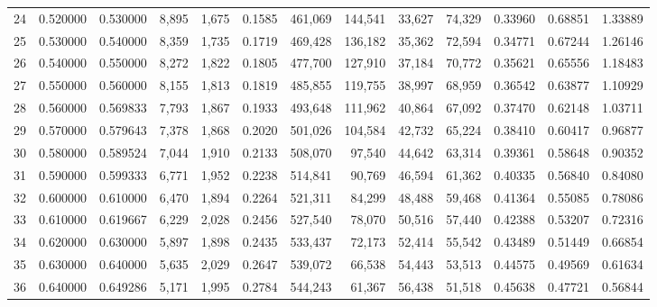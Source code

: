 \begin{tabular}{rrrrrrrrrrrrr}
24 &  0.520000 &  0.530000 &   8,895 &  1,675 &                                     0.1585 &  461,069 &  144,541 &   33,627 &   74,329 &  0.33960 &  0.68851 &  1.33889 \\
25 &  0.530000 &  0.540000 &   8,359 &  1,735 &                                     0.1719 &  469,428 &  136,182 &   35,362 &   72,594 &  0.34771 &  0.67244 &  1.26146 \\
26 &  0.540000 &  0.550000 &   8,272 &  1,822 &                                     0.1805 &  477,700 &  127,910 &   37,184 &   70,772 &  0.35621 &  0.65556 &  1.18483 \\
27 &  0.550000 &  0.560000 &   8,155 &  1,813 &                                     0.1819 &  485,855 &  119,755 &   38,997 &   68,959 &  0.36542 &  0.63877 &  1.10929 \\
28 &  0.560000 &  0.569833 &   7,793 &  1,867 &                                     0.1933 &  493,648 &  111,962 &   40,864 &   67,092 &  0.37470 &  0.62148 &  1.03711 \\
29 &  0.570000 &  0.579643 &   7,378 &  1,868 &                                     0.2020 &  501,026 &  104,584 &   42,732 &   65,224 &  0.38410 &  0.60417 &  0.96877 \\
30 &  0.580000 &  0.589524 &   7,044 &  1,910 &                                     0.2133 &  508,070 &   97,540 &   44,642 &   63,314 &  0.39361 &  0.58648 &  0.90352 \\
31 &  0.590000 &  0.599333 &   6,771 &  1,952 &                                     0.2238 &  514,841 &   90,769 &   46,594 &   61,362 &  0.40335 &  0.56840 &  0.84080 \\
32 &  0.600000 &  0.610000 &   6,470 &  1,894 &                                     0.2264 &  521,311 &   84,299 &   48,488 &   59,468 &  0.41364 &  0.55085 &  0.78086 \\
33 &  0.610000 &  0.619667 &   6,229 &  2,028 &                                     0.2456 &  527,540 &   78,070 &   50,516 &   57,440 &  0.42388 &  0.53207 &  0.72316 \\
34 &  0.620000 &  0.630000 &   5,897 &  1,898 &                                     0.2435 &  533,437 &   72,173 &   52,414 &   55,542 &  0.43489 &  0.51449 &  0.66854 \\
35 &  0.630000 &  0.640000 &   5,635 &  2,029 &                                     0.2647 &  539,072 &   66,538 &   54,443 &   53,513 &  0.44575 &  0.49569 &  0.61634 \\
36 &  0.640000 &  0.649286 &   5,171 &  1,995 &                                     0.2784 &  544,243 &   61,367 &   56,438 &   51,518 &  0.45638 &  0.47721 &  0.56844 \\

\end{tabular}
